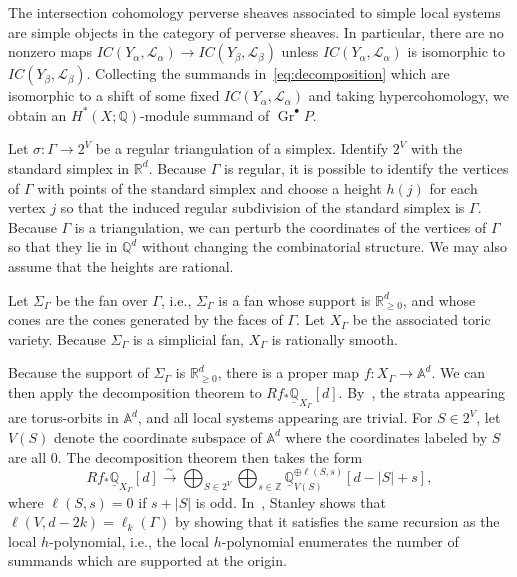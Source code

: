\documentclass[11pt]{article}
\theoremstyle{definition}
\numberwithin{equation}{section}
\numberwithin{equation}{section}
\begin{document}
The intersection cohomology perverse sheaves associated to simple local systems are simple objects in the category of perverse sheaves. In particular, there are no nonzero maps $IC(Y_{\alpha}, \mathcal{L}_{\alpha}) \to IC(Y_{\beta}, \mathcal{L}_{\beta})$ unless $IC(Y_{\alpha}, \mathcal{L}_{\alpha})$ is isomorphic to  $IC(Y_{\beta}, \mathcal{L}_{\beta})$. Collecting the summands in~\eqref{eq:decomposition} which are isomorphic to a shift of some fixed $IC(Y_{\alpha}, \mathcal{L}_{\alpha})$ and taking hypercohomology, we obtain an $H^*(X; \mathbb{Q})$-module summand of $\operatorname{Gr}^{\bullet} P$. 

Let $\sigma \colon \Gamma \to 2^V$ be a regular triangulation of a simplex. Identify $2^V$ with the standard simplex in $\mathbb{R}^d$.
Because $\Gamma$ is regular, it is possible to identify the vertices of $\Gamma$ with points of the standard simplex and choose a height $h(j)$ for each vertex $j$ so that the induced regular subdivision of the standard simplex is $\Gamma$. 
Because $\Gamma$ is a triangulation, we can perturb the coordinates of the vertices of $\Gamma$ so that they lie in $\mathbb{Q}^d$ without changing the combinatorial structure. We may also assume that the heights are rational. 

Let $\Sigma_{\Gamma}$ be the fan over $\Gamma$, i.e., $\Sigma_{\Gamma}$ is a fan whose support is $\mathbb{R}^d_{\ge 0}$, and whose cones are the cones generated by the faces of $\Gamma$. Let $X_{\Gamma}$ be the associated toric variety. Because $\Sigma_{\Gamma}$ is a simplicial fan, $X_{\Gamma}$ is rationally smooth. 

Because the support of $\Sigma_{\Gamma}$ is $\mathbb{R}^d_{\ge 0}$, there is a proper 
map $f \colon X_{\Gamma} \to \mathbb{A}^d$. We can then apply the decomposition theorem to $Rf_* \underline{\mathbb{Q}}_{X_{\Gamma}}[d]$. By~\cite[Theorem 5.1]{deCataldoMiglioriniMustata18}, the strata appearing are torus-orbits in $\mathbb{A}^d$, and all local systems appearing are trivial. For $S \in 2^V$, let $V(S)$ denote the coordinate subspace of $\mathbb{A}^d$ where the coordinates labeled by $S$ are all $0$. 
The decomposition theorem then takes the form
$$Rf_* \underline{\mathbb{Q}}_{X_{\Gamma}}[d] \stackrel{\sim}{\to} \bigoplus_{S \in 2^V} \bigoplus_{s \in \mathbb{Z}} \underline{\mathbb{Q}}_{V(S)}^{\oplus \ell(S, s)}[d - |S| + s],$$
where $\ell(S, s) = 0$ if $s + |S|$ is odd. 
In~\cite[Section 5]{Stanleylocalh}, Stanley shows that $\ell(V, d-2k) = \ell_{k}(\Gamma)$ by showing that it satisfies the same recursion as the local $h$-polynomial, i.e., the local $h$-polynomial enumerates the number of summands which are supported at the origin. 
\end{document}
